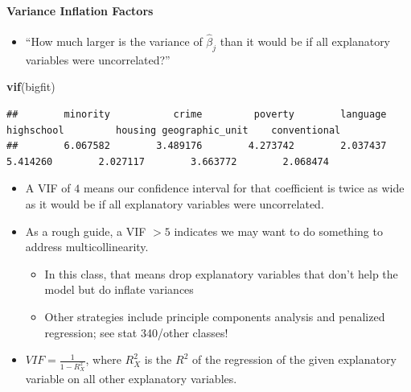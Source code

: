 \documentclass[landscape]{article}
\newenvironment{Shaded}{\begin{snugshade}}{\end{snugshade}}
\newcommand{\KeywordTok}[1]{\textcolor[rgb]{0.13,0.29,0.53}{\textbf{#1}}}
\newcommand{\NormalTok}[1]{#1}
\providecommand{\tightlist}{%
  \setlength{\itemsep}{0pt}\setlength{\parskip}{0pt}}
\let\oldparagraph\paragraph
\renewcommand{\paragraph}[1]{\oldparagraph{#1}\mbox{}}
\begin{document}
\newpage

\paragraph{Variance Inflation Factors}\label{variance-inflation-factors}

\begin{itemize}
\tightlist
\item
  ``How much larger is the variance of \(\hat{\beta}_j\) than it would
  be if all explanatory variables were uncorrelated?''
\end{itemize}

\begin{Shaded}
\begin{Highlighting}[]
\KeywordTok{vif}\NormalTok{(bigfit)}
\end{Highlighting}
\end{Shaded}

\begin{verbatim}
##        minority           crime         poverty        language      highschool         housing geographic_unit    conventional 
##        6.067582        3.489176        4.273742        2.037437        5.414260        2.027117        3.663772        2.068474
\end{verbatim}

\begin{itemize}
\tightlist
\item
  A VIF of \(4\) means our confidence interval for that coefficient is
  twice as wide as it would be if all explanatory variables were
  uncorrelated.
\end{itemize}

\vspace{3cm}

\begin{itemize}
\tightlist
\item
  As a rough guide, a VIF \(> 5\) indicates we may want to do something
  to address multicollinearity.

  \begin{itemize}
  \tightlist
  \item
    In this class, that means drop explanatory variables that don't help
    the model but do inflate variances
  \item
    Other strategies include principle components analysis and penalized
    regression; see stat 340/other classes!
  \end{itemize}
\item
  \(VIF = \frac{1}{1 - R_X^2}\), where \(R_X^2\) is the \(R^2\) of the
  regression of the given explanatory variable on all other explanatory
  variables.
\end{itemize}
\end{document}
